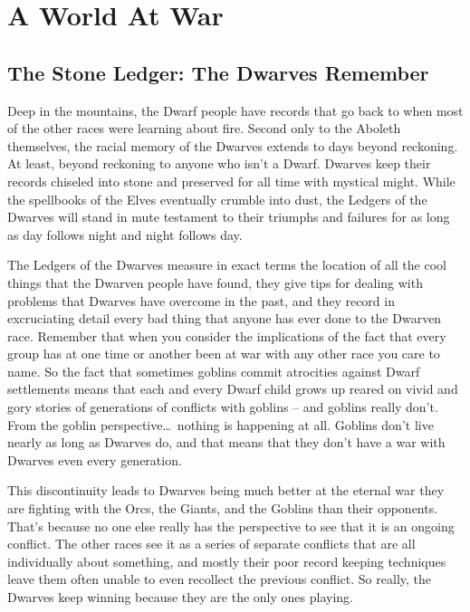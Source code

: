 \chapter{A World At War}
\vspace*{-10pt}

\section{The Stone Ledger: The Dwarves Remember}

Deep in the mountains, the Dwarf people have records that go back to when most of the other races were learning about fire. Second only to the Aboleth themselves, the racial memory of the Dwarves extends to days beyond reckoning. At least, beyond reckoning to anyone who isn't a Dwarf. Dwarves keep their records chiseled into stone and preserved for all time with mystical might. While the spellbooks of the Elves eventually crumble into dust, the Ledgers of the Dwarves will stand in mute testament to their triumphs and failures for as long as day follows night and night follows day.

The Ledgers of the Dwarves measure in exact terms the location of all the cool things that the Dwarven people have found, they give tips for dealing with problems that Dwarves have overcome in the past, and they record in excruciating detail every bad thing that anyone has ever done to the Dwarven race. Remember that when you consider the implications of the fact that every group has at one time or another been at war with any other race you care to name. So the fact that sometimes goblins commit atrocities against Dwarf settlements means that each and every Dwarf child grows up reared on vivid and gory stories of generations of conflicts with goblins -- and goblins really don't. From the goblin perspective\ldots\  nothing is happening at all. Goblins don't live nearly as long as Dwarves do, and that means that they don't have a war with Dwarves even every generation.

This discontinuity leads to Dwarves being much better at the eternal war they are fighting with the Orcs, the Giants, and the Goblins than their opponents. That's because no one else really has the perspective to see that it is an ongoing conflict. The other races see it as a series of separate conflicts that are all individually about something, and mostly their poor record keeping techniques leave them often unable to even recollect the previous conflict. So really, the Dwarves keep winning because they are the only ones playing.

